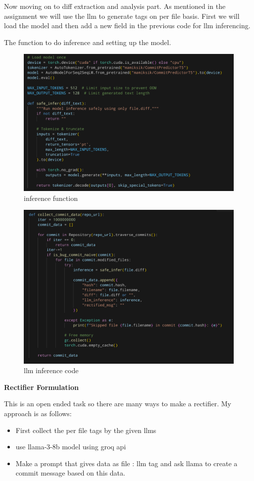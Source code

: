 \documentclass[a4paper,12pt,twoside,english]{all-in-one} %
\begin{document}
Now moving on to diff extraction and analysis part. As mentioned in the assignment we will use the llm to generate tags on per file basis. First we will load the model and then add a new field in the previous code for llm inferencing.


The function to do inference and setting up the model.
\begin{figure}
    \centering
    \includegraphics[width=0.75\linewidth]{image22.png}
    \caption{inference function}
    \label{fig:placeholder}
\end{figure}



\begin{figure}
    \centering
    \includegraphics[width=0.75\linewidth]{image23.png}
    \caption{llm inference code}
    \label{fig:placeholder}
\end{figure}


\textbf{Rectifier Formulation}

This is an open ended task so there are many ways to make a rectifier. My approach is as follows:
\begin{itemize}
    \item First collect the per file tags by the given llms
    \item use llama-3-8b model using groq api 
    \item Make a prompt that gives data as file : llm tag and ask llama to create a commit message based on this data.
\end{itemize}
\end{document}
